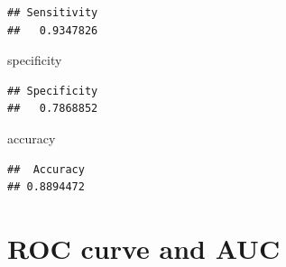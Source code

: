 \documentclass[
]{article}
\newenvironment{Shaded}{\begin{snugshade}}{\end{snugshade}}
\newcommand{\CommentTok}[1]{\textcolor[rgb]{0.56,0.35,0.01}{\textit{#1}}}
\newcommand{\NormalTok}[1]{#1}
\newcommand{\OtherTok}[1]{\textcolor[rgb]{0.56,0.35,0.01}{#1}}
\newcommand{\SpecialCharTok}[1]{\textcolor[rgb]{0.81,0.36,0.00}{\textbf{#1}}}
\newcommand{\StringTok}[1]{\textcolor[rgb]{0.31,0.60,0.02}{#1}}
\begin{document}
\begin{Shaded}
\end{Shaded}

\begin{verbatim}
## Sensitivity 
##   0.9347826
\end{verbatim}

\begin{Shaded}
\begin{Highlighting}[]
\NormalTok{specificity}
\end{Highlighting}
\end{Shaded}

\begin{verbatim}
## Specificity 
##   0.7868852
\end{verbatim}

\begin{Shaded}
\begin{Highlighting}[]
\NormalTok{accuracy}
\end{Highlighting}
\end{Shaded}

\begin{verbatim}
##  Accuracy 
## 0.8894472
\end{verbatim}

\section{ROC curve and AUC}\label{roc-curve-and-auc-2}
\end{document}
